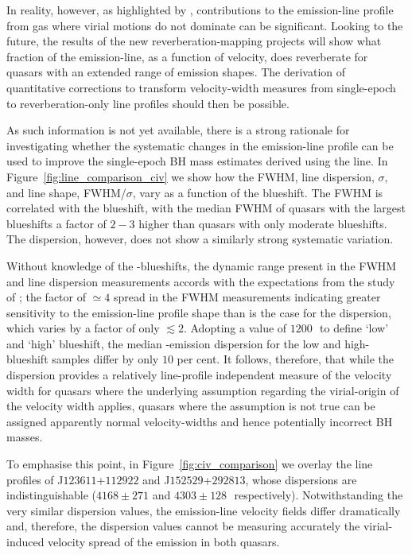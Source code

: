 In reality, however, as highlighted by \citet{denney12}, contributions to the  emission-line profile from gas where virial motions do not dominate can be significant.
Looking to the future, the results of the new reverberation-mapping projects \citep{shen15, kingoz15} will show what fraction of the  emission-line, as a function of velocity, does reverberate for quasars with an extended range of  emission shapes.
The derivation of quantitative corrections to transform velocity-width measures from single-epoch to reverberation-only line profiles should then be possible.

As such information is not yet available, there is a strong rationale for investigating whether the systematic changes in the  emission-line profile can be used to improve the single-epoch BH mass estimates derived using the  line.
In Figure~\ref{fig:line_comparison_civ} we show how the  FWHM, line dispersion, $\sigma$, and line shape, FWHM/$\sigma$, vary as a function of the blueshift.
The  FWHM is correlated with the blueshift, with the median FWHM of quasars with the largest blueshifts a factor of $2-3$ higher than quasars with only moderate blueshifts.
The dispersion, however, does not show a similarly strong systematic variation.

Without knowledge of the -blueshifts, the dynamic range present in the FWHM and line dispersion measurements accords with the expectations from the study of \citet{denney13}; the factor of $\simeq4$ spread in the FWHM measurements indicating greater sensitivity to the emission-line profile shape than is the case for the dispersion, which varies by a factor of only $\lesssim2$.
Adopting a value of $1200$\,\kms\, to define `low' and `high' blueshift, the median -emission dispersion for the low and high-blueshift samples differ by only $10$ per cent.
It follows, therefore, that while the dispersion provides a relatively line-profile independent measure of the velocity width for quasars where the underlying assumption regarding the virial-origin of the velocity width applies, quasars where the assumption is not true can be assigned apparently normal velocity-widths and hence potentially incorrect BH masses.

To emphasise this point, in Figure~\ref{fig:civ_comparison} we overlay the  line profiles of J$123611$+$112922$ and J$152529$+$292813$, whose dispersions are indistinguishable ($4168\pm271$ and $4303\pm128$\,\kms\, respectively).
Notwithstanding the very similar dispersion values, the emission-line velocity fields differ dramatically and, therefore, the dispersion values cannot be measuring accurately the virial-induced velocity spread of the  emission in both quasars.

